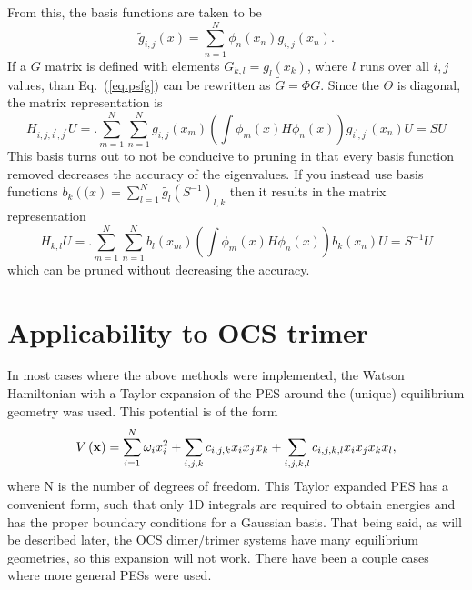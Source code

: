  From this, the basis functions are taken to be
\begin{equation}\label{eq.psfg}
\tilde{g}_{i,j}\left(x\right)=\sum_{n=1}^{N}\phi_n\left(x_n\right)g_{i,j}\left(x_n\right).
\end{equation}
If a $G$ matrix is defined with elements $G_{k,l}=g_{l}\left(x_k\right)$, where $l$ runs over all $i,j$ values, than Eq.~(\ref{eq.psfg}) can be rewritten as $\tilde{G}=\Phi G$. Since the $\Theta$ is diagonal, the matrix representation is
\begin{equation}\label{eq.psfg2}
H_{i,j,i^{\prime},j^{\prime}}U=.\sum_{m=1}^{N}\sum_{n=1}^{N}g_{i,j}\left(x_m\right)\left(\int \phi_m\left(x\right)H\phi_n\left(x\right)\right)g_{i^{\prime},j^{\prime}}\left(x_n\right)U=SU
\end{equation}
This basis turns out to not be conducive to pruning in that every basis function removed decreases the accuracy of the eigenvalues.  If you instead use basis functions $b_{k}\left((x\right)=\sum_{l=1}^N\tilde{g_{l}}\left(S^{-1}\right)_{l,k}$ then it results in the matrix representation
\begin{equation}\label{eq.psfg3}
H_{k,l}U=.\sum_{m=1}^{N}\sum_{n=1}^{N}b_{l}\left(x_m\right)\left(\int \phi_m\left(x\right)H\phi_n\left(x\right)\right)b_{k}\left(x_n\right)U=S^{-1}U
\end{equation}
which can be pruned without decreasing the accuracy.

\section{Applicability to OCS trimer}\label{sec.app}
In most cases where the above methods were implemented, the Watson 
Hamiltonian with a Taylor expansion of the PES around the (unique) equilibrium geometry was used.  This potential is of the form
\begin{equation}
V\left(\bf{x}\right)=\sum_{i=1}^N \omega_i x_i^2 + \sum_{i,j,k}c_{i,j,k}x_ix_jx_k+ \sum_{i,j,k,l}c_{i,j,k,l}x_ix_jx_kx_l,
\end{equation} 
where N is the number of degrees of freedom.  This Taylor expanded PES has a convenient form, such that only 1D integrals are required to obtain 
energies and has the proper boundary conditions for a Gaussian basis. 
That being said, as will be described later, the OCS dimer/trimer systems have many equilibrium geometries, so this expansion will not work.  There have been a couple cases where more general PESs were used.

